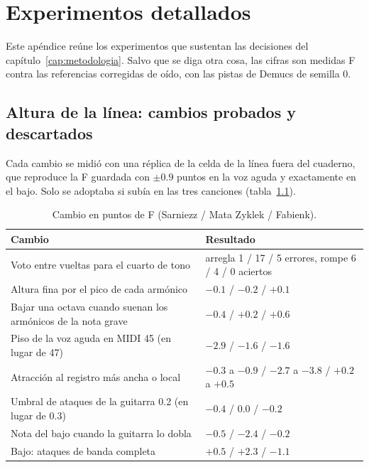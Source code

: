 \chapter{Experimentos detallados}\label{ap:experimentos}

Este apéndice reúne los experimentos que sustentan las decisiones del capítulo~\ref{cap:metodologia}. Salvo que se diga
otra cosa, las cifras son medidas F contra las referencias corregidas de oído, con las pistas de Demucs de semilla 0.

\section{Altura de la línea: cambios probados y descartados}

Cada cambio se midió con una réplica de la celda de la línea fuera del cuaderno, que reproduce la F guardada con
$\pm0.9$ puntos en la voz aguda y exactamente en el bajo. Solo se adoptaba si subía en las tres canciones
(tabla~\ref{tab:ronda-altura}).

\begin{table}[ht]
  \centering\small
  \caption{Cambio en puntos de F (Sarniezz / Mata Zyklek / Fabienk).}\label{tab:ronda-altura}
  \begin{tabularx}{\textwidth}{@{}>{\raggedright}X l@{}}
    \toprule
    Cambio & Resultado \\
    \midrule
    Voto entre vueltas para el cuarto de tono & arregla 1 / 17 / 5 errores, rompe 6 / 4 / 0 aciertos \\
    Altura fina por el pico de cada armónico & $-0.1$ / $-0.2$ / $+0.1$ \\
    Bajar una octava cuando suenan los armónicos de la nota grave & $-0.4$ / $+0.2$ / $+0.6$ \\
    Piso de la voz aguda en MIDI 45 (en lugar de 47) & $-2.9$ / $-1.6$ / $-1.6$ \\
    Atracción al registro más ancha o local & $-0.3$ a $-0.9$ / $-2.7$ a $-3.8$ / $+0.2$ a $+0.5$ \\
    Umbral de ataques de la guitarra 0.2 (en lugar de 0.3) & $-0.4$ / $0.0$ / $-0.2$ \\
    Nota del bajo cuando la guitarra lo dobla & $-0.5$ / $-2.4$ / $-0.2$ \\
    Bajo: ataques de banda completa & $+0.5$ / $+2.3$ / $-1.1$ \\
    \bottomrule
  \end{tabularx}
\end{table}

